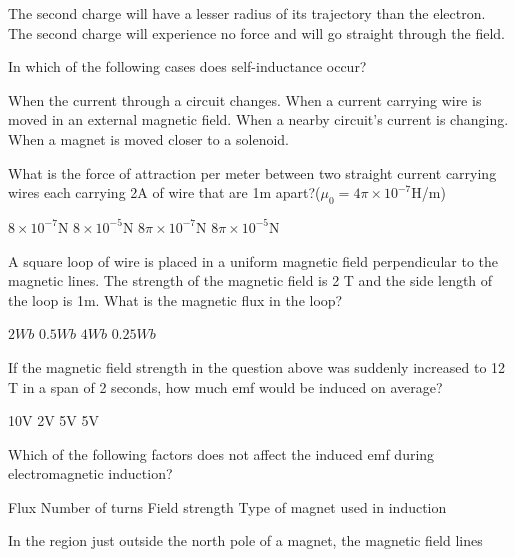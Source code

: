 \documentclass[12pt,addpoints]{exam}
\begin{document}
{{{\begin{questions}
\begin{choices}
						\choice The second charge will have a lesser radius of its trajectory than the electron.
						\choice The second charge will experience no force and will go straight through the field.
					\end{choices}
					\question In which of the following cases does self-inductance occur? 
					\begin{choices}
					\choice When the current through a circuit changes.
					\choice When a current carrying wire is moved in an external magnetic field.
					\choice When a nearby circuit's current is changing.
					\choice When a magnet is moved closer to a solenoid.
					\end{choices}
					\question What is the force of attraction per meter between two straight current carrying wires each carrying 2A of wire that are 1m apart?($\mu_0=4\pi\times10^{-7}$H/m)\\
					\begin{oneparchoices}
						\choice $8\times10^{-7}$N 
						\choice $8\times10^{-5}$N
						\choice $8\pi\times10^{-7}$N
						\choice $8\pi\times10^{-5}$N
					\end{oneparchoices}
					\question A square loop of wire is placed in a uniform magnetic field perpendicular to the magnetic lines. The strength of the magnetic field is 2 T and the side length of the loop is 1m. What is the magnetic flux in the loop?\\
					\begin{oneparchoices}
						\choice $2Wb$
						\choice $0.5Wb$
						\choice $4Wb$
						\choice $0.25Wb$
					\end{oneparchoices}
					\question  If the magnetic field strength in the question above was suddenly increased to 12 T in a span of 2 seconds, how much emf would be induced on average? \\
					\begin{oneparchoices}
						\choice 10V
						\choice 2V
						\choice 5V
						\choice 5V
					\end{oneparchoices}
					\question Which of the following factors does not affect the induced emf during electromagnetic induction? \\ \begin{oneparchoices}
						\choice Flux
						\choice Number of turns
						\choice Field strength
						\choice Type of magnet used in induction
					\end{oneparchoices}
					\question In the region just outside the north pole of a magnet, the magnetic field lines
					\begin{choices}

\end{choices}
\end{questions}}}}
\end{document}
